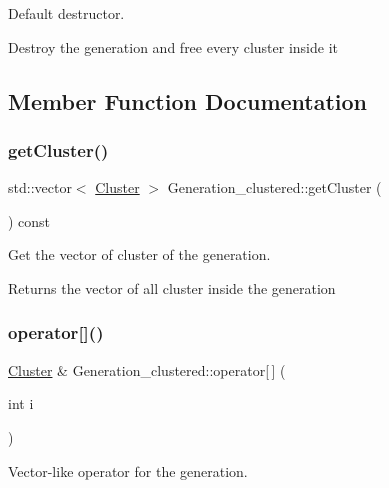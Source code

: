 Default destructor. 

Destroy the generation and free every cluster inside it 

\subsection{Member Function Documentation}
\mbox{\label{class_generation__clustered_ab45fdeb57a0d04cda57a5f023e132859}} 
\subsubsection{\texorpdfstring{get\+Cluster()}{getCluster()}}
{\footnotesize\ttfamily std\+::vector$<$ \hyperlink{class_cluster}{Cluster} $>$ Generation\+\_\+clustered\+::get\+Cluster (\begin{DoxyParamCaption}{ }\end{DoxyParamCaption}) const}



Get the vector of cluster of the generation. 

\begin{DoxyReturn}{Returns}
the vector of all cluster inside the generation 
\end{DoxyReturn}
\mbox{\label{class_generation__clustered_a7b02e7aaaba6cb2d171642044833d485}} 
\subsubsection{\texorpdfstring{operator[]()}{operator[]()}\hspace{0.1cm}{\footnotesize\ttfamily [1/2]}}
{\footnotesize\ttfamily \hyperlink{class_cluster}{Cluster} \& Generation\+\_\+clustered\+::operator\mbox{[}$\,$\mbox{]} (\begin{DoxyParamCaption}\item[{int}]{i }\end{DoxyParamCaption})}



Vector-\/like operator for the generation. 


